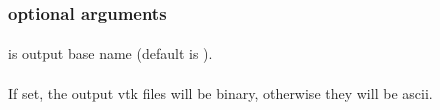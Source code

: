 \subsubsection{optional arguments}
\paragraph{}
 is output base name (default is ).
\paragraph{}
If set, the output vtk files will be binary, otherwise they will be ascii.
%
%
